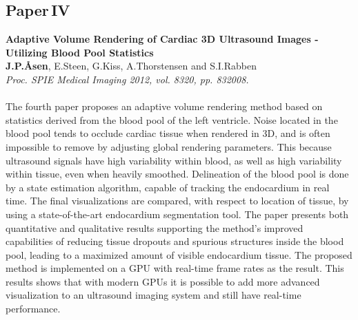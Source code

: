 \subsection{Paper\,IV}
\textbf{Adaptive Volume Rendering of Cardiac 3D Ultrasound Images - Utilizing Blood Pool Statistics}\\
\textbf{J.\:P.\:\AA{}sen}, E.\:Steen, G.\:Kiss, A.\:Thorstensen and S.\:I.\:Rabben\\
{\it Proc. SPIE Medical Imaging 2012, vol. 8320, pp. 832008.}\\\\
The fourth paper proposes an adaptive volume rendering method based on statistics derived from the blood pool of the left ventricle. Noise located in the blood pool tends to occlude cardiac tissue when rendered in 3D, and is often impossible to remove by adjusting global rendering parameters. This because ultrasound signals have high variability within blood, as well as high variability within tissue, even when heavily smoothed. Delineation of the blood pool is done by a state estimation algorithm, capable of tracking the endocardium in real time. The final visualizations are compared, with respect to location of tissue, by using a state-of-the-art endocardium segmentation tool. The paper presents both quantitative and qualitative results supporting the method's improved capabilities of reducing tissue dropouts and spurious structures inside the blood pool, leading to a maximized amount of visible endocardium tissue. The proposed method is implemented on a GPU with real-time frame rates as the result. This results shows that with modern GPUs it is possible to add more advanced visualization to an ultrasound imaging system and still have real-time performance.

